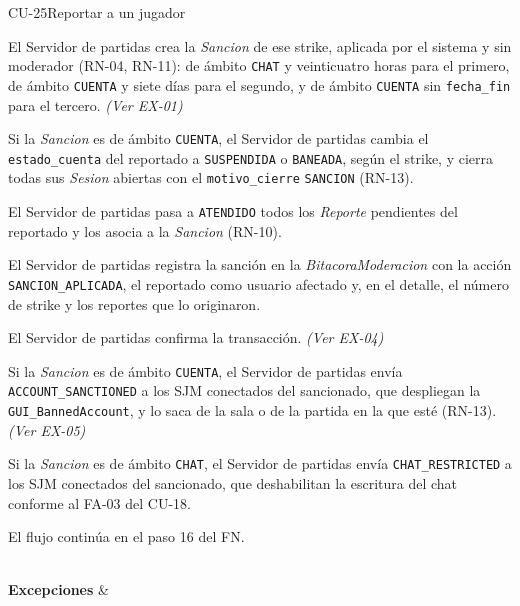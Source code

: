 \begin{fichacu}{CU-25}{Reportar a un jugador}
{\begin{cuenum}[start=1]
      \item El Servidor de partidas crea la \textit{Sancion} de ese strike, aplicada por el sistema y sin moderador (\mbox{RN-04}, \mbox{RN-11}): de ámbito \texttt{CHAT} y veinticuatro horas para el primero, de ámbito \texttt{CUENTA} y siete días para el segundo, y de ámbito \texttt{CUENTA} sin \texttt{fecha\_\allowbreak{}fin} para el tercero. \textit{(Ver \mbox{EX-01})}
      \item Si la \textit{Sancion} es de ámbito \texttt{CUENTA}, el Servidor de partidas cambia el \texttt{estado\_\allowbreak{}cuenta} del reportado a \texttt{SUSPENDIDA} o \texttt{BANEADA}, según el strike, y cierra todas sus \textit{Sesion} abiertas con el \texttt{motivo\_\allowbreak{}cierre} \texttt{SANCION} (\mbox{RN-13}).
      \item El Servidor de partidas pasa a \texttt{ATENDIDO} todos los \textit{Reporte} pendientes del reportado y los asocia a la \textit{Sancion} (\mbox{RN-10}).
      \item El Servidor de partidas registra la sanción en la \textit{BitacoraModeracion} con la acción \texttt{SANCION\_\allowbreak{}APLICADA}, el reportado como usuario afectado y, en el detalle, el número de strike y los reportes que lo originaron.
      \item El Servidor de partidas confirma la transacción. \textit{(Ver \mbox{EX-04})}
      \item Si la \textit{Sancion} es de ámbito \texttt{CUENTA}, el Servidor de partidas envía \texttt{ACCOUNT\_\allowbreak{}SANCTIONED} a los SJM conectados del sancionado, que despliegan la \texttt{GUI\_\allowbreak{}BannedAccount}, y lo saca de la sala o de la partida en la que esté (\mbox{RN-13}). \textit{(Ver \mbox{EX-05})}
      \item Si la \textit{Sancion} es de ámbito \texttt{CHAT}, el Servidor de partidas envía \texttt{CHAT\_\allowbreak{}RESTRICTED} a los SJM conectados del sancionado, que deshabilitan la escritura del chat conforme al \mbox{FA-03} del \mbox{CU-18}.
      \item El flujo continúa en el paso 16 del FN.
    \end{cuenum}} \\ \hline
  \textbf{Excepciones} & 
\end{fichacu}
